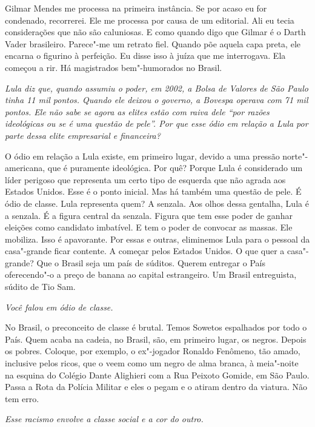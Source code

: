 \normalfont
Gilmar Mendes me processa na primeira instância. Se por
acaso eu for condenado, recorrerei. Ele me processa por causa de um
editorial. Ali eu tecia considerações que não são caluniosas. E como
quando digo que Gilmar é o Darth Vader brasileiro. Parece"-me um retrato
fiel. Quando põe aquela capa preta, ele encarna o figurino à perfeição.
Eu disse isso à juíza que me interrogava. Ela começou a rir. Há
magistrados bem"-humorados no Brasil.

\itshape
 Lula diz que, quando assumiu o poder, em 2002, a Bolsa
de Valores de São Paulo tinha 11 mil pontos. Quando ele deixou o
governo, a Bovespa operava com 71 mil pontos. Ele não sabe se agora as
elites estão com raiva dele ``por razões ideológicas ou se é uma questão
de pele''. Por que esse ódio em relação a Lula por parte dessa elite
empresarial e financeira?

\normalfont
O ódio em relação a Lula existe, em primeiro lugar,
devido a uma pressão norte"-americana, que é puramente ideológica.
Por quê? Porque Lula é
considerado um líder perigoso que representa um certo tipo de esquerda
que não agrada aos Estados Unidos. Esse é o ponto inicial. Mas há também
uma questão de pele. É ódio de classe. Lula representa quem? A senzala.
Aos olhos dessa gentalha, Lula é a senzala. É a figura central da
senzala. Figura que tem esse poder de ganhar eleições como candidato
imbatível. E tem o poder de convocar as massas. Ele mobiliza. Isso é
apavorante. Por essas e outras, eliminemos Lula para o pessoal da
casa"-grande ficar contente. A começar pelos Estados Unidos. O que quer a
casa"-grande? Que o Brasil seja um país de súditos. Querem entregar o
País oferecendo"-o a preço de banana ao capital estrangeiro. Um Brasil
entreguista, súdito de Tio Sam.

\itshape
 Você falou em ódio de classe.

\normalfont
No Brasil, o preconceito de classe é brutal. Temos
Sowetos espalhados por todo o País. Quem acaba na cadeia, no Brasil,
são, em primeiro lugar, os negros. Depois os pobres. Coloque, por
exemplo, o ex"-jogador Ronaldo Fenômeno, tão amado, inclusive pelos
ricos, que o veem como um negro de alma branca, à meia"-noite na esquina
do Colégio Dante Alighieri com a Rua Peixoto Gomide, em São Paulo. Passa
a Rota da Polícia Militar e eles o pegam e o atiram dentro da viatura.
Não tem erro.

\itshape
 Esse racismo envolve a classe social e a cor do outro.

